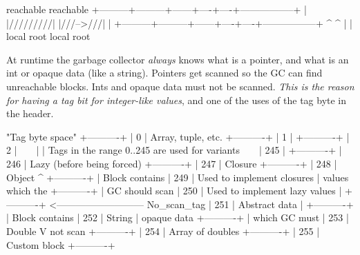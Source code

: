 \begin{enumerate}
\begin{enumerate}[(a)]
\begin{bluetext}
           reachable        reachable
+---------+---------+------+----+----+-----------------+
|         |/////////|      |///-->///|                 |
+---------+---------+------+----+----+-----------------+
           ^                ^
           |                |
        local root       local root
\end{bluetext}

    At runtime the garbage collector \textit{always} knows what is a pointer, and what is an int
    or opaque data (like a string). Pointers get scanned so the GC can find unreachable
    blocks. Ints and opaque data must not be scanned. \textit{This is the reason for having a tag
    bit for integer-like values}, and one of the uses of the tag byte in the header.

\begin{bluetext}
                  "Tag byte space"
+----------+
| 0        | Array, tuple, etc.
+----------+
| 1        |
+----------+
| 2        |
~          ~
|          | Tags in the range 0..245 are used for variants
~          ~
| 245      |
+----------+
| 246      | Lazy (before being forced)
+----------+
| 247      | Closure
+----------+
| 248      | Object                            ^
+----------+                                   |  Block contains
| 249      | Used to implement closures        |  values which the
+----------+                                   |  GC should scan
| 250      | Used to implement lazy values     |
+----------+ <---------------------------  No_scan_tag
| 251      | Abstract data                     |
+----------+                                   |  Block contains
| 252      | String                            |  opaque data
+----------+                                   |  which GC must
| 253      | Double                            V  not scan
+----------+
| 254      | Array of doubles
+----------+
| 255      | Custom block
+----------+

\end{bluetext}


\end{enumerate}
\end{enumerate}
